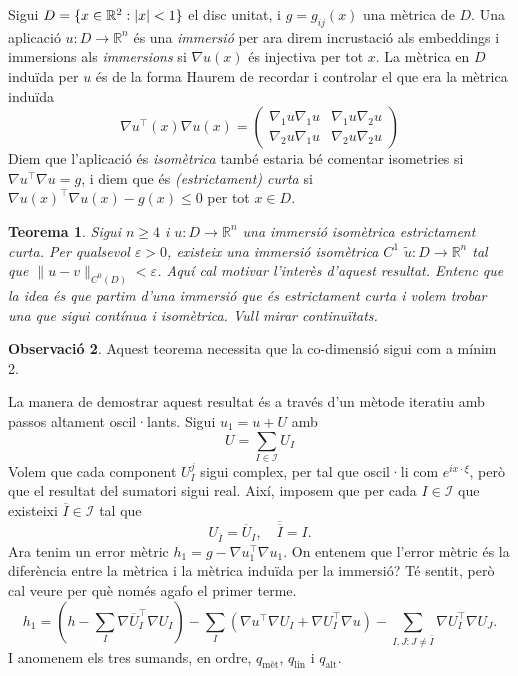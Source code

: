 \documentclass[11pt,a4paper,openright,oneside]{book}
\DeclarePairedDelimiter{\set}{\{}{\}}
\numberwithin{equation}{section}
\newtheorem{teo}{Teorema}[section]
\theoremstyle{definition}
\newtheorem{obs}[teo]{Observaci\'o}
\begin{document}
Sigui $D=\set{x\in\mathbb R^2 : |x|<1}$ el disc unitat, i $g = g_{ij}(x)$ una mètrica de $D$. Una aplicació $u:D\to\mathbb R^n$ és una \textit{immersió} {\color{blue} per ara direm incrustació als embeddings i immersions als \textit{immersions}} si $\nabla u(x)$ és injectiva per tot $x$. La mètrica en $D$ induïda per $u$ és de la forma {\color{blue} Haurem de recordar i controlar el que era la mètrica induïda}
\begin{equation*}
    \nabla u ^{\intercal}(x)\nabla u (x) = \begin{pmatrix}
    \nabla_1 u\nabla_1 u & \nabla_1 u\nabla_2 u\\
    \nabla_2 u\nabla_1 u & \nabla_2 u\nabla_2 u
    \end{pmatrix}
\end{equation*}
Diem que l'aplicació és \textit{isomètrica} {\color{blue} també estaria bé comentar isometries} si $\nabla u ^{\intercal}\nabla u = g$, i diem que és \textit{(estrictament) curta} si $\nabla u(x)^{\intercal} \nabla u(x) - g(x) \le 0$ per tot $x\in D$.
\begin{teo}
    Sigui $n\ge 4$ i $u:D\to\mathbb R^n$ una immersió isomètrica estrictament curta. Per qualsevol $\varepsilon > 0$, existeix una immersió isomètrica $C^1$ $\tilde u:D\to\mathbb R^n$ tal que $\|u-v\|_{C^0(D)} < \varepsilon$.{\color{blue} Aquí cal motivar l'interès d'aquest resultat. Entenc que la idea és que partim d'una immersió que és estrictament curta i volem trobar una que sigui contínua i isomètrica. Vull mirar continuïtats.}
\end{teo}
\begin{obs}
    Aquest teorema necessita que la co-dimensió sigui com a mínim 2.
\end{obs}
La manera de demostrar aquest resultat és a través d'un mètode iteratiu amb passos altament oscil·lants.
Sigui $u_1 = u + U$ amb 
\begin{equation*}
    U=\sum_{I\in\mathcal I} U_I
\end{equation*}
Volem que cada component $U_I^j$ sigui complex, per tal que oscil·li com $e^{ix \cdot \xi}$, però que el resultat del sumatori sigui real. Així, imposem que per cada $I\in\mathcal I$ que existeixi $\overline I\in\mathcal I$ tal que 
\begin{equation*}
    U_{\overline{I}} = \overline{U}_I, \quad \overline{\overline{I}} = I.
\end{equation*}
Ara tenim un error mètric $h_1 = g - \nabla u_1 ^{\intercal}\nabla u_1$. {\color{blue} On entenem que l'error mètric és la diferència entre la mètrica i la mètrica induïda per la immersió? Té sentit, però cal veure per què només agafo el primer terme.}
\begin{equation*}
    h_1 = 
        \left( h-\sum_{I} \nabla \overline{U}_I ^{\intercal}\nabla U_I \right) 
        - \sum_{I}\left( \nabla u ^{\intercal}\nabla U_I + \nabla U_I ^{\intercal}\nabla u \right)
        - \sum_{I,J: J\not = \overline I} \nabla U_I ^{\intercal}\nabla U_J.
\end{equation*}
I anomenem els tres sumands, en ordre, $q_{\text{mèt}}$, $q_{\text{lin}}$ i $q_{\text{alt}}$.
\end{document}
